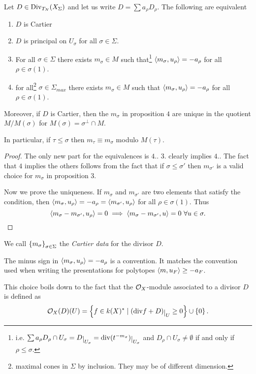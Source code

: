 \begin{proposition}[]\label{}
Let $D\in \operatorname{Div}_{T_N}(X_\Sigma)$ and let us write $D=\sum a_\rho D_\rho$. The following are equivalent
\begin{enumerate}
\item $D$ is Cartier
\item $D$ is principal on $U_\sigma$ for all $\sigma\in \Sigma$.
\item For all $\sigma\in \Sigma$ there exists $m_\sigma\in M$ such that\footnote{i.e. $\sum a_\rho D_\rho\cap U_\sigma=D\res{U_\sigma}=\div(t^{-m_\sigma})\res{U_\sigma}$ and $D_\rho\cap U_\sigma\neq \emptyset$ if and only if $\rho\leq \sigma$.} $\left\langle {m_\sigma,u_\rho}\right\rangle=-a_\rho$ for all $\rho\in \sigma(1)$.
\item for all\footnote{maximal cones in $\Sigma$ by inclusion. They may be of different dimension.} $\sigma\in \Sigma_{max}$ there exists $m_\sigma\in M$ such that $\left\langle {m_\sigma,u_\rho}\right\rangle=-a_\rho$ for all $\rho\in \sigma(1)$.
\end{enumerate}
Moreover, if $D$ is Cartier, then the $m_\sigma$ in proposition $4$ are unique in the quotient $M/M(\sigma)$ for $M(\sigma)=\sigma^\perp\cap M$.

In particular, if $\tau\leq \sigma$ then $m_\tau\equiv m_\sigma$ modulo $M(\tau)$.
\end{proposition}
\begin{proof}
The only new part for the equivalences is $4.$. $3.$ clearly implies $4.$. The fact that $4$ implies the others follows from the fact that if $\sigma\leq \sigma'$ then $m_{\sigma'}$ is a valid choice for $m_\sigma$ in proposition 3.

Now we prove the uniqueness. If $m_\sigma$ and $m_{\sigma'}$ are two elements that satisfy the condition, then $\left\langle {m_\sigma,u_\rho}\right\rangle=-a_\rho=\left\langle {m_{\sigma'},u_\rho}\right\rangle$ for all $\rho\in \sigma(1)$. Thus
\[\left\langle {m_\sigma-m_{\sigma'},u_\rho}\right\rangle=0\implies \left\langle {m_\sigma-m_{\sigma'},u}\right\rangle=0\ \forall u\in \sigma.\]
\end{proof}


\begin{notation}
We call $\left\{{m_\sigma}\right\}_{\sigma\in \Sigma}$ the \textit{Cartier data} for the divisor $D$.
\end{notation}

\begin{remark}
The minus sign in $\left\langle {m_\sigma,u_\rho}\right\rangle=-a_\rho$ is a convention. It matches the convention used when writing the presentations for polytopes $\left\langle {m,u_F}\right\rangle\geq -a_F$.

This choice boils down to the fact that the $\mathcal{O}_X$-module associated to a divisor $D$ is defined as
\[\Oc_X(D)(U)=\cpa{f\in k(X)^\ast\mid (\div f+D)\res U\geq 0}\cup\cpa{0}.\]
\end{remark}



